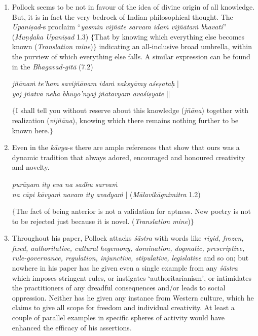 \begin{enumerate}
\item Pollock seems to be not in favour of the idea of divine origin of all knowledge. But, it is in fact the very bedrock of Indian philosophical thought. The {\it Upaniṣad}-s proclaim ``\textit{yasmin vijñāte sarvam idaṁ vijñātaṁ bhavati}'' (\textit{Muṇḍaka Upaniṣad} 1.3) $\{$That by knowing which everything else becomes known (\textit{Translation mine})$\}$ indicating an all-inclusive broad umbrella, within the purview of which everything else falls. A similar expression can be found in the \textit{Bhagavad-gītā} (7.2)
\begin{myquote}
\textit{jñānaṁ te'ham savijñānam idaṁ vakṣyāmy aśeṣataḥ} |\\
\textit{yaj jñātvā neha bhūyo'nyaj jñātavyam avaśiṣyate} ||
\end{myquote}
$\{$I shall tell you without reserve about this knowledge ({\it jñāna}) together with realization ({\it vijñāna}), knowing which there remains nothing further to be known here.$\}$

\item Even in the {\it kāvya}-s there are ample references that show that ours was a dynamic tradition that always adored, encouraged and honoured creativity and novelty.
\begin{myquote}
\textit{purāṇam ity eva na sadhu sarvaṁ}\\
\textit{na cāpi kāvyaṁ navam ity avadyaṁ} | (\textit{Mālavikāgnimitra}  1.2)
\end{myquote}
$\{$The fact of being anterior is not a validation for aptness. New poetry is not to be rejected just because it is novel. (\textit{Translation mine})$\}$

\item Throughout his paper, Pollock attacks {\it śāstra} with words like \textit{rigid, frozen, fixed, authoritative, cultural hegemony, domination, dogmatic, prescriptive, rule-governance, regulation, injunctive, stipulative, legislative} and so on; but nowhere in his paper has he given even a single example from any {\it śāstra} which imposes stringent rules, or instigates `authoritarianism', or intimidates the practitioners of any dreadful consequences and/or leads to social oppression. Neither has he given any instance from Western culture, which he claims to give all scope for freedom and individual creativity. At least a couple of parallel examples in specific spheres of activity would have enhanced the efficacy of his assertions.


\end{enumerate}
